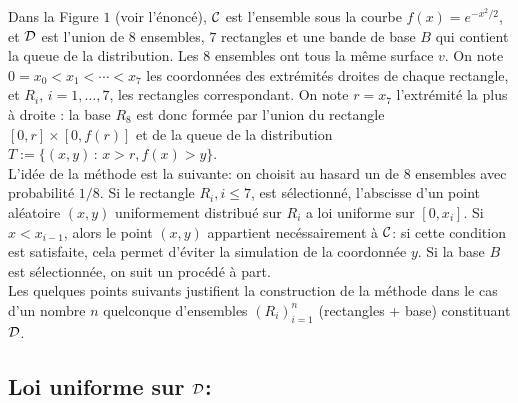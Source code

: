 \documentclass[a4paper]{article}
\begin{document}
Dans la Figure $1$ (voir l'\'enonc\'e), ${\cal C}$ est l'ensemble sous la courbe $f(x) = e^{-x^2/2}$, et ${\cal D}$ est l'union de $8$ ensembles, $7$ rectangles et une bande de base $B$ qui contient la queue de la distribution. Les $8$ ensembles ont tous la m\^eme surface $v$. On note $0=x_0<x_1<\cdots<x_7$ les coordonn\'ees des extr\'emit\'es droites de chaque rectangle, et $R_i,\,i=1,\ldots,7$, les rectangles correspondant. On note $r=x_7$ l'extr\'emit\'e la plus \`a droite : la base $R_8$ est donc form\'ee par l'union du rectangle $[0,r]\times[0,f(r)]$ et de la queue de la distribution $T:=\{(x,y)\,:\,x>r,f(x)>y\}$.
\\L'id\'ee de la m\'ethode est la suivante: on choisit au hasard un de $8$ ensembles avec probabilit\'e $1/8$. Si le rectangle $R_i, i\leq7$, est s\'electionn\'e, l'abscisse d'un point al\'eatoire $(x,y)$ uniformement distribu\'e sur $R_i$ a loi uniforme sur $[0,x_i]$. Si $x<x_{i-1}$, alors le point $(x,y)$ appartient nec\'essairement \`a ${\cal C}$: si cette condition est satisfaite, cela permet d'\'eviter la simulation de la coordonn\'ee $y$. Si la base $B$ est s\'electionn\'ee, on suit un proc\'ed\'e \`a part.
\\Les quelques points suivants justifient la construction de la m\'ethode dans le cas d'un nombre $n$ quelconque d'ensembles $(R_i)_{i=1}^n$ (rectangles + base) constituant ${\cal D}$.


\subsection{Loi uniforme sur ${\cal D}$:}
\end{document}
